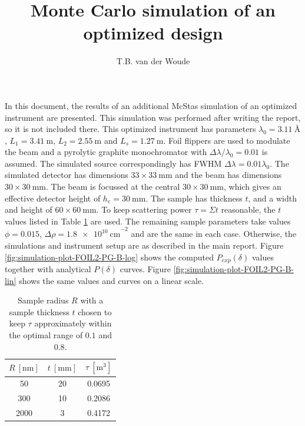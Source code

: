 \documentclass[]{article}
\title{Monte Carlo simulation of an optimized design}
\author{T.B. van der Woude}
\begin{document}
	
	\maketitle
	
	In this document, the results of an additional McStas simulation of an optimized instrument are presented. This simulation was performed after writing the report, so it is not included there. This optimized instrument has parameters $\lambda_0 = \SI{3.11}{\angstrom}$, $L_1 = \SI{3.41}{\meter}$, $L_2 = \SI{2.55}{\meter}$ and $L_s = \SI{1.27}{\meter}$. Foil flippers are used to modulate the beam and a pyrolytic graphite monochromator with $\Delta\lambda/\lambda_0 = 0.01$ is assumed. The simulated source correspondingly has FWHM $\Delta\lambda = 0.01\lambda_0$. The simulated detector has dimensions $33 \times 33 ~\unit{\milli\meter}$ and the beam has dimensions $30 \times 30 ~\unit{\milli\meter}$. The beam is focussed at the central $30 \times 30 ~\unit{\milli\meter}$, which gives an effective detector height of $h_e = \SI{30}{\milli\meter}$. The sample has thickness $t$, and a width and height of $60 \times 60 ~\unit{\milli\meter}$. To keep scattering power $\tau = \Sigma t$ reasonable, the $t$ values listed in Table \ref{tab:sample-thickness} are used. The remaining sample parameters take values $\phi = 0.015$, $\Delta\rho = \SI{1.8e10}{\centi\meter}^{-2}$ and are the same in each case. Otherwise, the simulations and instrument setup are as described in the main report. Figure \ref{fig:simulation-plot-FOIL2-PG-B-log} shows the computed $P_{exp}(\delta)$ values together with analytical $P(\delta)$ curves. Figure \ref{fig:simulation-plot-FOIL2-PG-B-lin} shows the same values and curves on a linear scale.
	\begin{table}[h!]
		\centering
		\begin{tabular}{c|cc}
			\toprule
			$R ~[\unit{\nano\meter}]$  & $t ~[\unit{\milli\meter}]$& $\tau~[\unit{\meter^3}]$ \\
			\midrule
			\num{50} & \num{20} & \num{0.0695}\\
			\num{300} & \num{10} & \num{0.2086} \\
			\num{2000} & \num{3} & \num{0.4172} \\
			\bottomrule
		\end{tabular}
		\caption{Sample radius $R$ with a sample thickness $t$ chosen to keep $\tau$ approximately within the optimal range of $0.1$ and $0.8$.}
		\label{tab:sample-thickness}
	\end{table}
\end{document}
